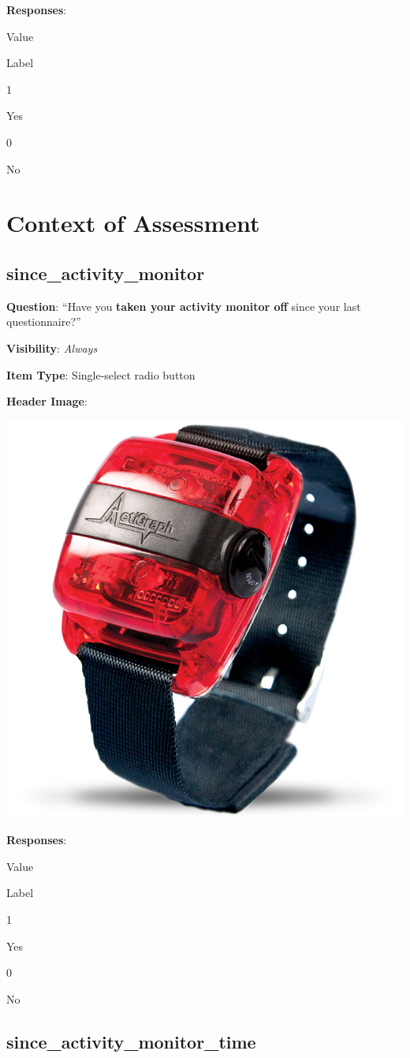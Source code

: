 \documentclass[]{book}
\begin{document}
\textbf{Responses}:

Value

Label

1

Yes

0

No

\hypertarget{context_section}{%
\chapter{Context of Assessment}\label{context_section}}

\hypertarget{since_activity_monitor}{%
\section{since\_activity\_monitor}\label{since_activity_monitor}}

\textbf{Question}: ``Have you \textbf{taken your activity monitor off} since your last questionnaire?''

\textbf{Visibility}: \emph{Always}

\textbf{Item Type}: Single-select radio button

\textbf{Header Image}:

\begin{flushleft}\includegraphics[width=0.33\linewidth]{downloadFigs4latex_NIMH_Applet_Codebook/since_activity_monitor_headerImg} \end{flushleft}

\textbf{Responses}:

Value

Label

1

Yes

0

No

\hypertarget{since_activity_monitor_time}{%
\section{since\_activity\_monitor\_time}\label{since_activity_monitor_time}}
\end{document}
